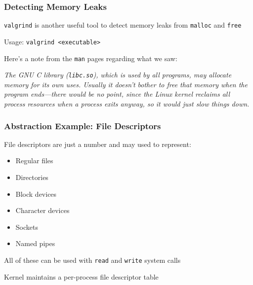 \documentclass[aspectratio=169]{beamer}
\begin{document}
  \begin{frame}
    \frametitle{Detecting Memory Leaks}

    \texttt{valgrind} is another useful tool to detect memory leaks from
    \texttt{malloc} and \texttt{free}

    \hspace{1em} Usage: \texttt{valgrind <executable>}

    \vspace{1em}

    Here's a note from the \texttt{man} pages regarding what we saw:

    \textit{The GNU C library (\texttt{libc.so}), which is used by all programs,
      may allocate memory for its own uses. Usually it doesn't bother to free
      that memory when the program ends—there would be no point, since the Linux
      kernel reclaims all process resources when a process exits anyway, so it
      would just slow things down.}

    \vspace{1em}

  \end{frame}

  \begin{frame}
    \frametitle{Abstraction Example: File Descriptors}

    File descriptors are just a number and may used to represent:
    \begin{itemize}
      \item Regular files
      \item Directories
      \item Block devices
      \item Character devices
      \item Sockets
      \item Named pipes
    \end{itemize}

    All of these can be used with \texttt{read} and \texttt{write} system calls

    \vspace{1em}

    Kernel maintains a per-process file descriptor table
  \end{frame}
\end{document}
